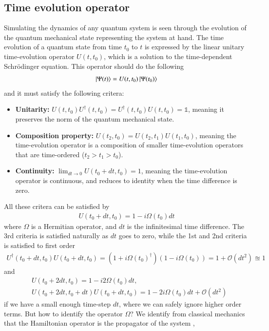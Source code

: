\documentclass{subfiles}
\begin{document}
\subsection{Time evolution operator}
Simulating the dynamics of any quantum system is seen through the evolution of the quantum mechanical state representing the system at hand. The time evolution of a quantum state from time $t_0$ to $t$ is expressed by the linear unitary time-evolution operator $U(t, t_0)$, which is a solution to the time-dependent Schrödinger equation.\cite{sakurai1986modern, berera2021quantum} This operator should do the following
\begin{equation}
    \ket{\Psi(t)} = U(t, t_0)\ket{\Psi(t_0)}
\end{equation}
and it must satisfy the following critera:
\begin{itemize}
    \item \textbf{Unitarity:} $U(t, t_0)U^\dagger(t, t_0) = U^\dagger(t, t_0)U(t, t_0) = \mathbb{1}$, meaning it preserves the norm of the quantum mechanical state.
    \item \textbf{Composition property:} $U(t_2, t_0) = U(t_2, t_1)U(t_1, t_0)$, meaning the time-evolution operator is a composition of smaller time-evolution operators that are time-ordered ($t_2>t_1>t_0$).
    \item \textbf{Continuity:} $\lim_{dt\to 0}U(t_0 + dt, t_0) = \mathcal{1}$, meaning the time-evolution operator is continuous, and reduces to identity when the time difference is zero.
\end{itemize}
All these critera can be satisfied by 
\begin{align*}
    U(t_0 + dt, t_0) = 1 - i\Omega(t_0) dt
\end{align*}
where $\Omega$ is a Hermitian operator, and $dt$ is the infinitesimal time difference. The 3rd criteria is satisfied naturally as $dt$ goes to zero, while the 1st and 2nd criteria is satisfied to first order 
\begin{align*}
    U^\dagger(t_0 + dt, t_0)U(t_0 + dt, t_0) = (1 + i\Omega(t_0)^\dagger)(1 - i\Omega(t_0)) = 1 + \mathcal{O}(dt^2) \approxeq 1
\end{align*}
and
\begin{align*}
    &U(t_0 + 2dt, t_0) = 1 - i2\Omega(t_0)dt, \\
    &U(t_0 + 2dt, t_0 +dt)U(t_0 + dt, t_0) = 1 - 2i\Omega(t_0)dt + \mathcal{O}(dt^2)
\end{align*}
if we have a small enough time-step $dt$, where we can safely ignore higher order terms. But how to identify the operator $\Omega$? We identify from classical mechanics that the Hamiltonian operator is the propagator of the system \cite{sakurai1986modern}, 
\end{document}
